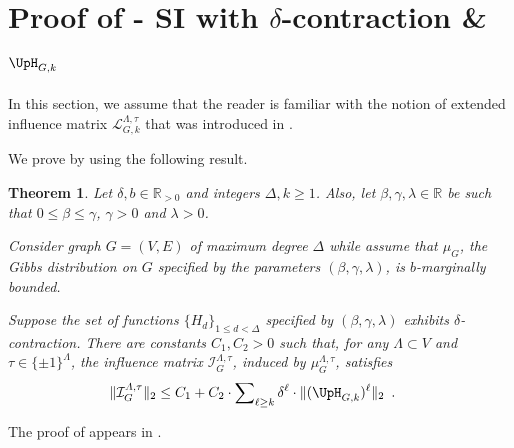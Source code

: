 \documentclass[11pt,reqno]{amsart}
\numberwithin{equation}{section}
\newtheorem{theorem}{Theorem}[section]
\newcommand{\cI}{{\mathcal{I}}}
\newcommand{\cL}{{\mathcal{L}}}
\newcommand{\applegreen}[1]{ {\color{applegreen}#1}}
\newcommand{\bluepigment}[1]{{\color{blue(pigment)}#1}}
\newcommand{\cadmiumgreen}[1]{{\color{cadmiumgreen}#1}}
\newcommand{\goldenbrown}[1]{{\color{goldenbrown}#1}}
\newcommand{\maxDeg}{{\Delta}}
\newcommand{\logtrecur}{H}
\newcommand{\infmatrix}{\cI}
\newcommand{\norm}[2]{\goldenbrown{\|} #1 \goldenbrown{\|}_{#2}}
\newcommand{\NBMatrix}{\cadmiumgreen{\UpH}_{G,\kk}}
\newcommand{\spreadpoint}{\newpage}
\newcommand{\LastReviewG}[1]{{\color{magenta}\hspace{.2cm} [Rev: \textrm{#1} - \bluepigment{G} ] \hspace{.2cm}}}
\renewcommand{\LastReviewG}[1]{}
\renewcommand{\spreadpoint}{}
\renewcommand{\applegreen}[1]{#1}
\renewcommand{\bluepigment}[1]{#1}
\renewcommand{\cadmiumgreen}[1]{#1}
\renewcommand{\goldenbrown}[1]{#1}
\newcommand{\kk}{\bluepigment{k}}
\newcommand{\kell}{{\color{green(pigment)}\ell}}%
\renewcommand{\kk}{k}
\renewcommand{\kell}{\ell}
\newcommand{\ExtdInfMatrixF}{\applegreen{\cL}^{\Lambda,\tau}_{G,\kk}}
\begin{document}






\spreadpoint

\section{Proof of  - SI with $\delta$-contraction \& $\NBMatrix$ \LastReviewG{2025-03-12}}
\label{sec:thrm:NonBacktrackingInfinityMixing}

In this section, we assume that the reader is familiar with the notion of extended influence matrix $\ExtdInfMatrixF$
that was introduced in . 


We prove  by using the following result. 

\begin{theorem}\label{thrm:L2InflRedux2KNBTM}
Let $\delta, b \in \mathbb{R}_{>0}$ and integers $\maxDeg, \kk\geq 1$. 
Also, let $\beta,\gamma, \lambda\in \mathbb{R}$ be such that $0\leq \beta\leq \gamma$, 
$\gamma >0$ and $\lambda>0$. 

Consider graph $G=(V,E)$ of maximum degree $\maxDeg$ while 
assume that $\mu_G$, the Gibbs distribution on $G$ specified by the parameters $(\beta, \gamma, \lambda)$,
is $b$-marginally bounded.


%
Suppose  the set of functions $\{ \logtrecur_d\}_{1\leq d< \maxDeg}$ 
specified by $(\beta,\gamma,\lambda)$ exhibits $\delta$-contraction.
%
There are constants $C_1,C_2>0$ such that, for any $\Lambda\subset V$ and $\tau\in \{\pm 1\}^{\Lambda}$,
 the influence matrix $\infmatrix^{\Lambda,\tau}_{G}$, induced by $\mu^{\Lambda,\tau}_G$, satisfies 
%
\begin{align}\nonumber
 \norm{ \infmatrix^{\Lambda,\tau}_{G}}{2}  &\leq 
 C_1+C_2 \cdot \sum\nolimits_{\kell\geq \kk}  \delta^{\kell} \cdot \norm{ ( \NBMatrix)^{\kell}}{2}  \enspace .
\end{align}
\end{theorem}
The proof of  appears in .

 
 
 
\end{document}
